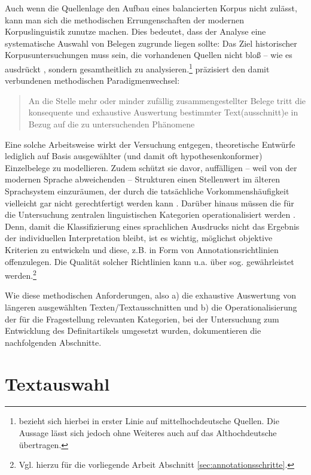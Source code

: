 Auch wenn die Quellenlage den Aufbau eines balancierten Korpus nicht zulässt, kann man sich die methodischen Errungenschaften der modernen Korpuslinguistik zunutze machen. Dies bedeutet, dass der Analyse eine systematische Auswahl von Belegen zugrunde liegen sollte: Das Ziel historischer Korpusuntersuchungen muss sein, die vorhandenen Quellen nicht bloß -- wie es \textcite[1310]{Wegera2000} ausdrückt , sondern gesamtheitlich zu analysieren.\footnote{\textcite{Wegera2000} bezieht sich hierbei in erster Linie auf mittelhochdeutsche Quellen. Die Aussage lässt sich jedoch ohne Weiteres auch auf das Althochdeutsche übertragen.} \textcite{Fleischer2015} präzisiert den damit verbundenen methodischen Paradigmenwechsel:
\blockcquote[382]{Fleischer2015}{An die Stelle mehr oder minder zufällig zusammengestellter Belege tritt die konsequente und exhaustive Auswertung bestimmter Text(ausschnitt)e in Bezug auf die zu untersuchenden Phänomene}. Eine solche Arbeitsweise wirkt der Versuchung entgegen, theoretische Entwürfe lediglich auf Basis ausgewählter (und damit oft hypothesenkonformer) Einzelbelege zu modellieren. Zudem schützt sie davor, auffälligen -- weil von der modernen Sprache abweichenden -- Strukturen einen Stellenwert im älteren Sprachsystem einzuräumen, der durch die tatsächliche Vorkommenshäufigkeit vielleicht gar nicht gerechtfertigt werden kann \parencite[383]{Fleischer2015}. Darüber hinaus müssen die für die Untersuchung zentralen linguistischen Kategorien operationalisiert werden  \parencite[113--116]{Lemnitzer2015}. Denn, damit die Klassifizierung eines sprachlichen Ausdrucks nicht das Ergebnis der individuellen Interpretation bleibt, ist es wichtig, möglichst objektive Kriterien zu entwickeln und diese, z.B. in Form von Annotationsrichtlinien offenzulegen. Die Qualität solcher Richtlinien kann u.a. über sog.  gewährleistet werden.\footnote{Vgl. hierzu für die vorliegende Arbeit Abschnitt \ref{sec:annotationsschritte}.} 

Wie diese methodischen Anforderungen, also a) die exhaustive Auswertung von längeren ausgewählten Texten/Textausschnitten und b) die Operationalisierung der für die Fragestellung relevanten Kategorien, bei der Untersuchung zum Entwicklung des Definitartikels umgesetzt wurden, dokumentieren die nachfolgenden Abschnitte.


\section{Textauswahl}\label{sec:textauswahl}

